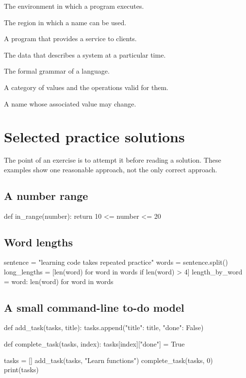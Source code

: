 \documentclass[11pt,openany,oneside]{book}
\begin{document}
\begin{description}[style=nextline,leftmargin=2.7cm,labelwidth=2.4cm]
\item[Runtime] The environment in which a program executes.
\item[Scope] The region in which a name can be used.
\item[Server] A program that provides a service to clients.
\item[State] The data that describes a system at a particular time.
\item[Syntax] The formal grammar of a language.
\item[Type] A category of values and the operations valid for them.
\item[Variable] A name whose associated value may change.
\end{description}

\chapter{Selected practice solutions}

The point of an exercise is to attempt it before reading a solution. These examples show one reasonable approach, not the only correct approach.

\section{A number range}

\begin{code}[language=Python]
def in_range(number):
    return 10 <= number <= 20
\end{code}

\section{Word lengths}

\begin{code}[language=Python]
sentence = "learning code takes repeated practice"
words = sentence.split()
long_lengths = [len(word) for word in words if len(word) > 4]
length_by_word = {word: len(word) for word in words}
\end{code}

\section{A small command-line to-do model}

\begin{code}[language=Python]
def add_task(tasks, title):
    tasks.append({"title": title, "done": False})

def complete_task(tasks, index):
    tasks[index]["done"] = True

tasks = []
add_task(tasks, "Learn functions")
complete_task(tasks, 0)
print(tasks)
\end{code}
\end{document}
